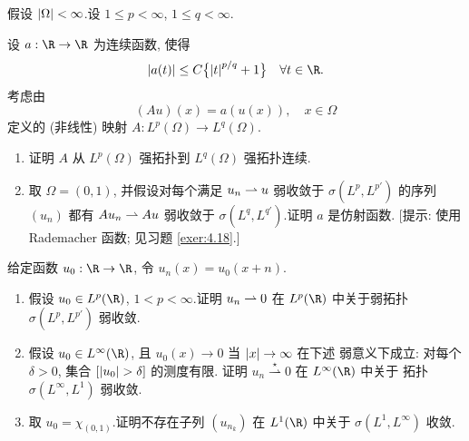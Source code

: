 \begin{exercise}
\label{exer:4.20}
假设 $\left|\Omega\right|<\infty$.设 $1\le p<\infty$, $1\le q<\infty$.

设 $a:\R\to\R$ 为连续函数, 使得
\begin{equation*}
\abs{a(t)}\le C\bigl\{\abs{t}^{p/q}+1\bigr\}\quad\forall t\in\R.
\end{equation*}
考虑由
\begin{equation*}
(Au)(x)=a(u(x)),\quad x\in\Omega
\end{equation*}
定义的 (非线性) 映射 $A:L^p(\Omega)\to L^q(\Omega)$.
\begin{enumerate}[label=\arabic*., leftmargin=2.2em, itemsep=0.35em]
	\item 证明 $A$ 从 $L^p(\Omega)$ 强拓扑到 $L^q(\Omega)$ 强拓扑连续.
	\item 取 $\Omega=(0,1)$, 并假设对每个满足 $u_n\rightharpoonup u$ 弱收敛于
	      $\sigma(L^p,L^{p'})$ 的序列 $(u_n)$ 都有 $Au_n\rightharpoonup Au$ 弱收敛于
	      $\sigma(L^q,L^{q'})$.证明 $a$ 是仿射函数.
	      [提示: 使用 Rademacher 函数; 见习题  \ref{exer:4.18}.]
\end{enumerate}
\end{exercise}

\begin{exercise}
\label{exer:4.21}
给定函数 $u_0:\R\to\R$, 令 $u_n(x)=u_0(x+n)$.
\begin{enumerate}[label=\arabic*., leftmargin=2.2em, itemsep=0.35em]
	\item 假设 $u_0\in L^p(\R)$, $1<p<\infty$.证明 $u_n\rightharpoonup0$ 在 $L^p(\R)$
	      中关于弱拓扑 $\sigma(L^p,L^{p'})$ 弱收敛.
	\item 假设 $u_0\in L^\infty(\R)$, 且 $u_0(x)\to0$ 当 $\left|x\right|\to\infty$ 在下述
	      弱意义下成立: 对每个 $\delta>0$, 集合 $[\abs{u_0}>\delta]$ 的测度有限.
	      证明 $u_n\overset{\star}{\rightharpoonup}0$ 在 $L^\infty(\R)$ 中关于
	      \wstar{}拓扑 $\sigma(L^\infty,L^1)$ 弱收敛.
	\item 取 $u_0=\chi_{(0,1)}$.证明不存在子列 $(u_{n_k})$ 在 $L^1(\R)$ 中关于
	      $\sigma(L^1,L^\infty)$ 收敛.
\end{enumerate}
\end{exercise}

